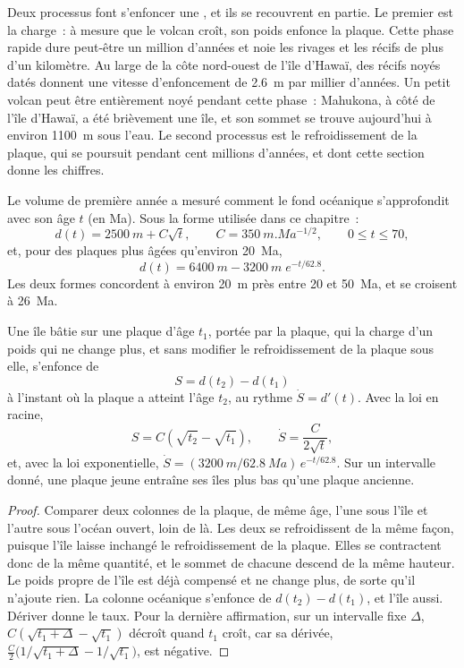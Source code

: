 Deux processus font s'enfoncer une , et ils se recouvrent en partie. Le premier est
la charge~: à mesure que le volcan croît, son poids enfonce la plaque. Cette phase rapide dure
peut-être un million d'années et noie les rivages et les récifs de plus d'un kilomètre. Au large
de la côte nord-ouest de l'île d'Hawaï, des récifs noyés datés donnent une vitesse d'enfoncement
de \qty{2.6}{m} par millier d'années. Un petit volcan peut être entièrement noyé pendant cette
phase~: Mahukona, à côté de l'île d'Hawaï, a été brièvement une île, et son sommet se trouve
aujourd'hui à environ \qty{1100}{m} sous l'eau. Le second processus est le refroidissement de la
plaque, qui se poursuit pendant cent millions d'années, et dont cette section donne les chiffres.

Le volume de première année a mesuré comment le fond océanique s'approfondit
avec son âge $t$ (en \unit{Ma}). Sous la forme utilisée dans ce chapitre~:
\[
d(t) = \qty{2500}{m} + C\sqrt{t}, \qquad C = \qty{350}{m.Ma^{-1/2}}, \qquad 0 \le t \le 70,
\]
et, pour des plaques plus âgées qu'environ \qty{20}{Ma},
\[
d(t) = \qty{6400}{m} - \qty{3200}{m}\; e^{-t/62.8}.
\]
Les deux formes concordent à environ \qty{20}{m} près
entre 20 et \qty{50}{Ma}, et se croisent à \qty{26}{Ma}.

\begin{proposition}\label{prop:b2:oceanic-islands:sinking}
Une île bâtie sur une plaque d'âge $t_1$, portée par la plaque, qui la charge d'un poids
qui ne change plus, et sans modifier le refroidissement de la plaque sous elle, s'enfonce de
\[
S = d(t_2) - d(t_1)
\]
à l'instant où la plaque a atteint l'âge $t_2$, au rythme $\dot S = d'(t)$. Avec la loi en racine,
\[
S = C\left(\sqrt{t_2} - \sqrt{t_1}\right), \qquad \dot S = \frac{C}{2\sqrt t},
\]
et, avec la loi exponentielle, $\dot S = (\qty{3200}{m}/\qty{62.8}{Ma})\,e^{-t/62.8}$. Sur
un intervalle donné, une plaque jeune entraîne ses îles plus bas qu'une plaque ancienne.
\end{proposition}

\begin{proof}
Comparer deux colonnes de la plaque, de même âge, l'une sous l'île et l'autre sous l'océan ouvert, loin de là. Les deux se
refroidissent de la même façon, puisque l'île laisse inchangé le refroidissement de la plaque. Elles se contractent donc de
la même quantité, et le sommet de chacune descend de la même hauteur. Le poids propre de l'île est déjà compensé et ne change
plus, de sorte qu'il n'ajoute rien. La colonne océanique s'enfonce de $d(t_2) - d(t_1)$, et l'île aussi. Dériver donne le taux.
Pour la dernière affirmation, sur un intervalle fixe $\Delta$, $C(\sqrt{t_1 + \Delta} -
\sqrt{t_1})$ décroît quand $t_1$ croît, car sa dérivée, $\frac C2\bigl(1/\sqrt{t_1 + \Delta}
- 1/\sqrt{t_1}\bigr)$, est négative.
\end{proof}

